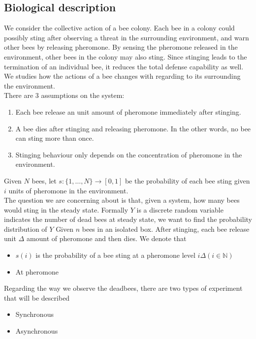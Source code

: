 \documentclass[12pt]{article}
\begin{document}
\subsection{Biological description}
We consider the collective action of a bee colony. Each bee in a colony could
possibly sting after observing a threat in the surrounding environment, and warn
other bees by releasing pheromone. By sensing the pheromone released in the
environment, other bees in the colony may also sting. Since stinging leads to
the termination of an individual bee, it reduces the total defense capability as
well. We studies how the actions of a bee changes with regarding to its
surrounding the environment.\\
There are 3 assumptions on the system:
\begin{enumerate}
\item Each bee release an unit amount of pheromone immediately after stinging.
\item A bee dies after stinging and releasing pheromone. In the other words, no
  bee can sting more than once.
\item Stinging behaviour only depends on the concentration of pheromone in the
  environment.
\end{enumerate}
Given $N$ bees, let $s:\{1,\ldots,N\}\rightarrow[0,1]$ be the probability of
each bee sting given $i$ units of pheromone in the environment.\\

The question we are concerning about is that, given a system, how many bees
would sting in the steady state. Formally $Y$ is a discrete random variable
indicates the number of dead bees at steady state, we want to find the
probability distribution of $Y$ Given $n$ bees in an isolated box. After
stinging, each bee release unit $\Delta$ amount of pheromone and then dies. We
denote that
\begin{itemize}
\item $s(i)$ is the probability of a bee sting at a pheromone level $i\Delta
  (i\in \mathbb{N})$
\item At pheromone 
\end{itemize}

Regarding the way we observe the deadbees, there are two types of experiment
that will be described
\begin{itemize}
\item Synchronous
\item Asynchronous
\end{itemize}
\end{document}
